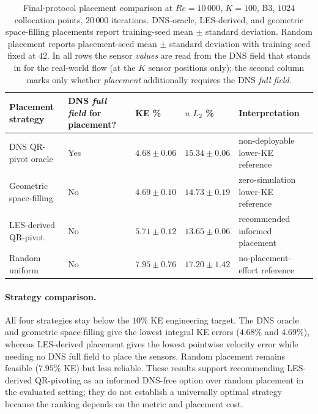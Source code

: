 \begin{table}[!htbp]
    \centering
    \caption{Final-protocol placement comparison at $Re=10\,000$, $K=100$, B3, $1024$ collocation points, $20\,000$ iterations. DNS-oracle, LES-derived, and geometric space-filling placements report training-seed mean $\pm$ standard deviation. Random placement reports placement-seed mean $\pm$ standard deviation with training seed fixed at $42$. In all rows the sensor \emph{values} are read from the DNS field that stands in for the real-world flow (at the $K$ sensor positions only); the second column marks only whether \emph{placement} additionally requires the DNS \emph{full field}.}
    \label{tab:placement_strategy_new}
    \footnotesize
    \setlength{\tabcolsep}{3pt}
    \begin{tabularx}{\textwidth}{
        >{\raggedright\arraybackslash}p{3.4cm}
        >{\centering\arraybackslash}X
        >{\centering\arraybackslash}X
        >{\centering\arraybackslash}X
        >{\centering\arraybackslash}X
    }
    \toprule
    \textbf{Placement strategy} & \textbf{DNS \emph{full field} for placement?} & \textbf{KE \%} & \textbf{$u$ $L_2$ \%} & \textbf{Interpretation} \\
    \midrule
    DNS QR-pivot oracle & Yes & $\mathbf{4.68 \pm 0.06}$ & $15.34 \pm 0.06$ & non-deployable lower-KE reference \\
    Geometric space-filling & No & $\mathbf{4.69 \pm 0.10}$ & $14.73 \pm 0.19$ & zero-simulation lower-KE reference \\
    LES-derived QR-pivot & No & $5.71 \pm 0.12$ & $\mathbf{13.65 \pm 0.06}$ & recommended informed placement \\
    Random uniform & No & $7.95 \pm 0.76$ & $17.20 \pm 1.42$ & no-placement-effort reference \\
    \bottomrule
    \end{tabularx}
\end{table}

\paragraph{Strategy comparison.}
All four strategies stay below the $10\%$ KE engineering target. The DNS oracle and geometric space-filling give the lowest integral KE errors ($4.68\%$ and $4.69\%$), whereas LES-derived placement gives the lowest pointwise velocity error while needing no DNS full field to place the sensors. Random placement remains feasible ($7.95\%$ KE) but less reliable. These results support recommending LES-derived QR-pivoting as an informed DNS-free option over random placement in the evaluated setting; they do not establish a universally optimal strategy because the ranking depends on the metric and placement cost.

